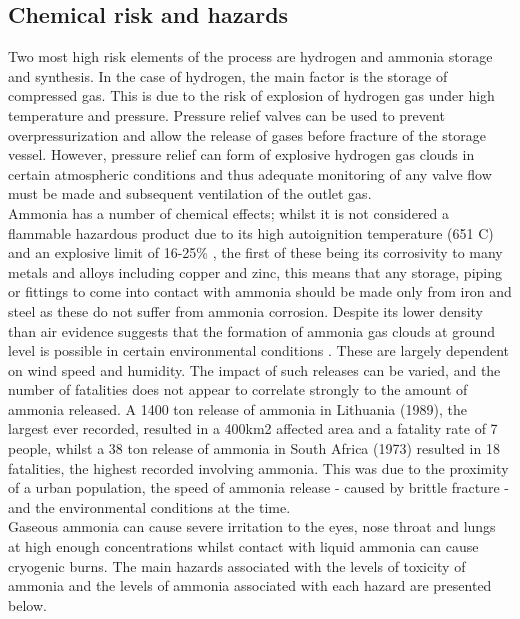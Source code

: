 \documentclass[11pt, a4paper]{article}
\begin{document}
{\subsection{Chemical risk and hazards}
Two most high risk elements of the process are hydrogen and ammonia storage and synthesis. In the case of hydrogen, the main factor is the storage of compressed gas. This is due to the risk of explosion of hydrogen gas under high temperature and pressure. Pressure relief valves can be used to prevent overpressurization and allow the release of gases before fracture of the storage vessel. However, pressure relief can form of explosive hydrogen gas clouds in certain atmospheric conditions and thus adequate monitoring of any valve flow must be made and subsequent ventilation of the outlet gas. 
\\
Ammonia has a number of chemical effects; whilst it is not considered a  flammable hazardous product due to its high autoignition temperature (651 \textdegree C) and an explosive limit of 16-25\% \cite{Ojha2010}, the first of these being its corrosivity to many metals and alloys including copper and zinc, this means that any storage, piping or fittings to come into contact with ammonia should be made only from iron and steel as these do not suffer from ammonia corrosion.
Despite its lower density than air evidence suggests that the formation of ammonia gas clouds at ground level is possible in certain environmental conditions \cite{Griffiths1982}. These are largely dependent on wind speed and humidity. The impact of such releases can be varied, and the number of fatalities does not appear to correlate strongly to the amount of ammonia released. A 1400 ton release of ammonia in Lithuania (1989), the largest ever recorded, resulted in a 400km2 affected area and a fatality rate of 7 people, whilst a 38 ton release of ammonia in South Africa (1973) resulted in 18 fatalities,  the highest recorded involving ammonia. This was due to the proximity of a urban population, the speed of ammonia release - caused by brittle fracture - and the environmental conditions at the time\cite{Ojha2010}. 
\\
Gaseous ammonia can cause severe irritation to the eyes, nose throat and lungs at high enough concentrations whilst contact with liquid ammonia can cause cryogenic burns. The main hazards associated with the levels of toxicity of ammonia and the levels of ammonia associated with each hazard are presented below.

}
\end{document}
